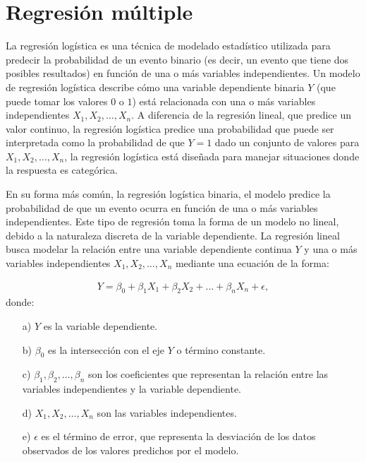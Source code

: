 \documentclass[12pt]{article}
\begin{document}


\section{Regresi\'on m\'ultiple}

La regresión logística es una técnica de modelado estadístico utilizada para predecir la probabilidad de un evento binario (es decir, un evento que tiene dos posibles resultados) en función de una o más variables independientes.  Un modelo de regresión logística describe cómo una variable dependiente binaria $Y$ (que puede tomar los valores $0$ o $1$) está relacionada con una o más variables independientes $X_1, X_2, \ldots, X_n$. A diferencia de la regresión lineal, que predice un valor continuo, la regresión logística predice una probabilidad que puede ser interpretada como la probabilidad de que $Y=1$ dado un conjunto de valores para $X_1, X_2, \ldots, X_n$, la regresión logística está diseñada para manejar situaciones donde la respuesta es categórica. 
\medskip

En su forma más común, la regresión logística binaria, el modelo predice la probabilidad de que un evento ocurra en función de una o más variables independientes. Este tipo de regresión toma la forma de un modelo no lineal, debido a la naturaleza discreta de la variable dependiente. La regresión lineal busca modelar la relación entre una variable dependiente continua $Y$ y una o más variables independientes $X_1, X_2, \ldots, X_n$ mediante una ecuación de la forma:

\begin{eqnarray*}
Y = \beta_0 + \beta_1 X_1 + \beta_2 X_2 + \ldots + \beta_n X_n + \epsilon,
\end{eqnarray*}
donde:
\begin{itemize}
    \item[a) ] $Y$ es la variable dependiente.
    \item[b) ] $\beta_0$ es la intersección con el eje $Y$ o término constante.
    \item[c) ] $\beta_1, \beta_2, \ldots, \beta_n$ son los coeficientes que representan la relación entre las variables independientes y la variable dependiente.
    \item[d) ] $X_1, X_2, \ldots, X_n$ son las variables independientes.
    \item[e) ] $\epsilon$ es el término de error, que representa la desviación de los datos observados de los valores predichos por el modelo.
\end{itemize}
\end{document}
